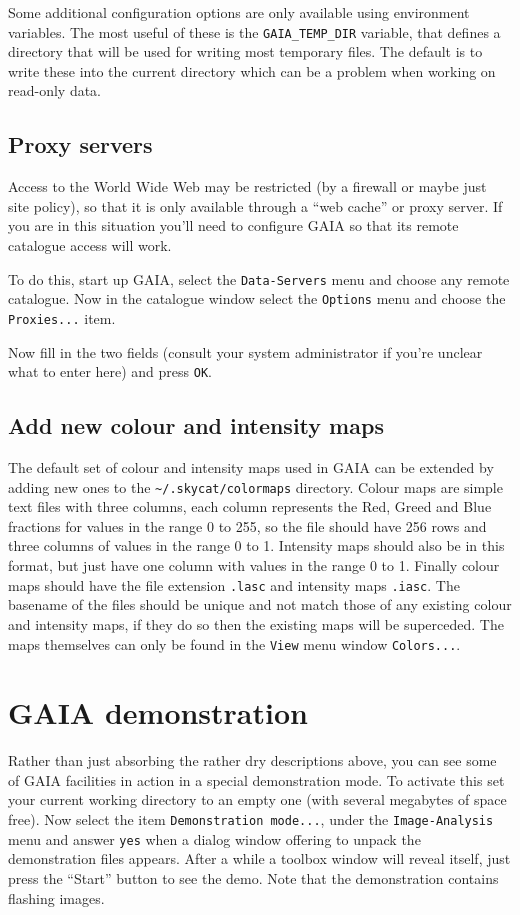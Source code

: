 \documentclass[twoside,11pt,nolof]{starlink}
\providecommand{\mytt}[1]{{\texttt{#1}}}
\begin{document}
Some additional configuration options are only available using environment
variables. The most useful of these is the \mytt{GAIA\_TEMP\_DIR} variable,
that defines a directory that will be used for writing most temporary files.
The default is to write these into the current directory which can be a
problem when working on read-only data.

\subsection{Proxy servers}
Access to the World Wide Web may be restricted (by a firewall or maybe
just site policy), so that it is only available through a ``web
cache'' or proxy server. If you are in this situation you'll need to
configure GAIA so that its remote catalogue access will work.

To do this, start up GAIA, select the \mytt{Data-Servers} menu and
choose any remote catalogue. Now in the catalogue window select the
\mytt{Options} menu and choose the \mytt{Proxies...} item.

Now fill in the two fields (consult your system administrator if you're
unclear what to enter here) and press \mytt{OK}.


\subsection{Add new colour and intensity maps}
The default set of colour and intensity maps used in GAIA can be extended by
adding new ones to the \mytt{\~{}/.skycat/colormaps} directory. Colour maps
are simple text files with three columns, each column represents the Red,
Greed and Blue fractions for values in the range 0 to 255, so the file should
have 256 rows and three columns of values in the range 0 to 1. Intensity maps
should also be in this format, but just have one column with values in the
range 0 to 1. Finally colour maps should have the file extension \mytt{.lasc}
and intensity maps \mytt{.iasc}. The basename of the files should be unique
and not match those of any existing colour and intensity maps, if they do so
then the existing maps will be superceded. The maps themselves can only be
found in the \mytt{View} menu window \mytt{Colors...}.

\section{GAIA demonstration}
Rather than just absorbing the rather dry descriptions above, you can
see some of GAIA facilities in action in a special demonstration
mode. To activate this set your current working directory to an empty
one (with several megabytes of space free). Now select the item
\mytt{Demonstration mode...}, under the \mytt{Image-Analysis} menu and
answer \mytt{yes} when a dialog window offering to unpack the
demonstration files appears. After a while a toolbox window will
reveal itself, just press the ``Start'' button to see the demo. Note
that the demonstration contains flashing images.
\end{document}

